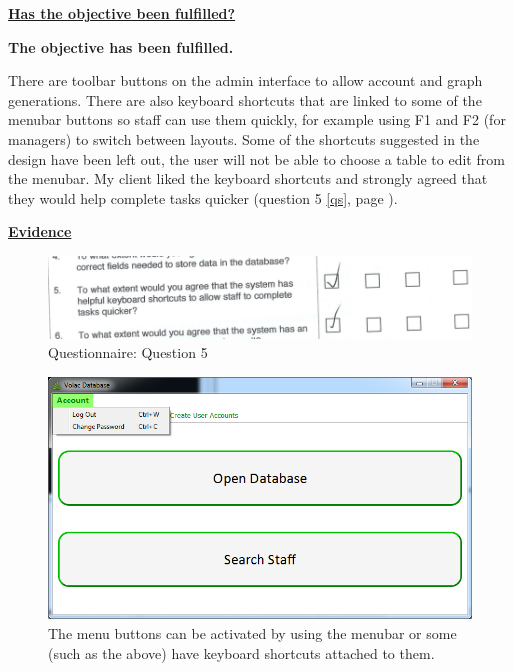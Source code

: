 \underline{\textbf{Has the objective been fulfilled?}}

\textbf{The objective has been fulfilled.}

There are toolbar buttons on the admin interface to allow account and graph generations. There are also keyboard shortcuts that are linked to some of the menubar buttons so staff can use them quickly, for example using F1 and F2 (for managers) to switch between layouts. Some of the shortcuts suggested in the design have been left out, the user will not be able to choose a table to edit from the menubar. My client liked the keyboard shortcuts and strongly agreed that they would help complete tasks quicker (question 5 \ref{qs}, page \pageref{qs}).

\underline{\textbf{Evidence}}

\begin{figure}[H]
    \includegraphics[width=\textwidth]{./Evaluation/EvaluationQuestionnaire/5.png}
    \caption{Questionnaire: Question 5} 
\end{figure}

\begin{figure}[H]
    \includegraphics[width=\textwidth]{./Evaluation/Images/shortcuts1.png}
    \caption{The menu buttons can be activated by using the menubar or some (such as the above) have keyboard shortcuts attached to them.} 
\end{figure}

